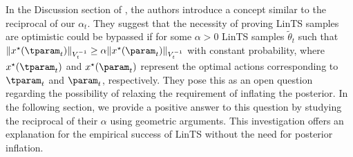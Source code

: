 \begin{remark}
In the Discussion section of \citet{abeille2017linear}, the authors introduce a concept similar to the reciprocal of our $\alpha_t$. They suggest that the necessity of proving LinTS samples are optimistic could be bypassed if for some $\alpha > 0$ LinTS samples $\tilde{\theta}_t$ such that $\|x^\star(\tparam_t)\|_{V_t^{-1}} \geq \alpha \|x^\star(\param_t)\|_{V_t^{-1}}$ with constant probability, where $x^\star(\tparam_t)$ and $x^\star(\param_t)$ represent the optimal actions corresponding to $\tparam_t$ and $\param_t$, respectively. They pose this as an open question regarding the possibility of relaxing the requirement of inflating the posterior. In the following section, we provide a positive answer to this question by studying the reciprocal of their $\alpha$ using geometric arguments. This investigation offers an explanation for the empirical success of LinTS without the need for posterior inflation.
\end{remark}








 



